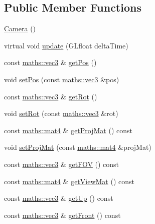 \subsection*{Public Member Functions}
\begin{DoxyCompactItemize}
\item 
\hyperlink{classspork_1_1graphics_1_1_camera_a24c84a147cee9c82b55ef887bc514755}{Camera} ()
\item 
virtual void \hyperlink{classspork_1_1graphics_1_1_camera_aeecd63e4bf4617ef72b91d3b12037638}{update} (G\+Lfloat delta\+Time)
\item 
const \hyperlink{structspork_1_1maths_1_1vec3}{maths\+::vec3} \& \hyperlink{classspork_1_1graphics_1_1_camera_a9708c5d4e89467bcc677daa04052eb87}{get\+Pos} ()
\item 
void \hyperlink{classspork_1_1graphics_1_1_camera_ab9b1a41bcb92ebdd6e7c01b5c0f7c1de}{set\+Pos} (const \hyperlink{structspork_1_1maths_1_1vec3}{maths\+::vec3} \&pos)
\item 
const \hyperlink{structspork_1_1maths_1_1vec3}{maths\+::vec3} \& \hyperlink{classspork_1_1graphics_1_1_camera_ae6a19862d6049eb50b742ddbb8365a57}{get\+Rot} ()
\item 
void \hyperlink{classspork_1_1graphics_1_1_camera_aefaec9421f08eb10103b5feeb345b959}{set\+Rot} (const \hyperlink{structspork_1_1maths_1_1vec3}{maths\+::vec3} \&rot)
\item 
const \hyperlink{structspork_1_1maths_1_1mat4}{maths\+::mat4} \& \hyperlink{classspork_1_1graphics_1_1_camera_a7f02442363f407cbdb137fac4bf9ffcb}{get\+Proj\+Mat} () const
\item 
void \hyperlink{classspork_1_1graphics_1_1_camera_a51edc9ff1d5e1dd15da08273e71fa00a}{set\+Proj\+Mat} (const \hyperlink{structspork_1_1maths_1_1mat4}{maths\+::mat4} \&proj\+Mat)
\item 
const \hyperlink{structspork_1_1maths_1_1vec3}{maths\+::vec3} \& \hyperlink{classspork_1_1graphics_1_1_camera_aceadde709af74b6ea6e68361bf407098}{get\+F\+OV} () const
\item 
const \hyperlink{structspork_1_1maths_1_1mat4}{maths\+::mat4} \& \hyperlink{classspork_1_1graphics_1_1_camera_a4f743bbc03938f78c227bcf06c4800e0}{get\+View\+Mat} () const
\item 
const \hyperlink{structspork_1_1maths_1_1vec3}{maths\+::vec3} \& \hyperlink{classspork_1_1graphics_1_1_camera_a6e74066de4f73bcf6e047eef177eb932}{get\+Up} () const
\item 
const \hyperlink{structspork_1_1maths_1_1vec3}{maths\+::vec3} \& \hyperlink{classspork_1_1graphics_1_1_camera_aeea19dc04c77632663a08da627b81f6a}{get\+Front} () const

\end{DoxyCompactItemize}
